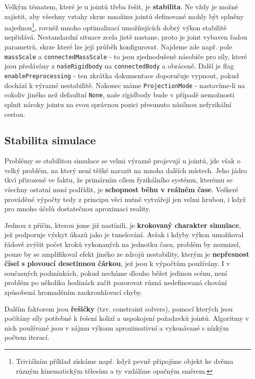 Velkým tématem, které je u jointů třeba řešit, je \textbf{stabilita}. Ne vždy je možné zajistit, aby všechny vztahy skrze množinu jointů definované mohly být splněny najednou\footnote{Triviálním příklad získáme např. když pevně připojíme objekt ke dvěma různým kinematickým tělesům a ty vzdálíme opačným směrem.}, rovněž mnoho optimalizací umožňujících dobrý výkon stabilitě nepřidává. Nestandardní situace zcela jistě nastane, proto je joint vybaven řadou parametrů, skrze které lze její průběh konfigurovat. Najdeme zde např. pole \texttt{massScale} a \texttt{connectedMassScale} - to jsou zjednodušeně násobiče pro síly, které jsou předávány z \texttt{našeRigidbody} na \texttt{connectedBody} a obráceně. Další je flag \texttt{enablePreprocessing} - ten zkrátka dokumentace doporučuje vypnout, pokud dochází k výrazné nestabilitě. Nakonec máme \texttt{ProjectionMode} - nastavíme-li na cokoliv jiného než defaultní \texttt{None}, naše rigidbody bude v případě nemožnosti splnit nároky jointu na svou správnou pozici přesunuto násilnou nefyzikální cestou. 

\subsection{Stabilita simulace} \label{physicsIntroSimulationStabilitySubsection}

Problémy se stabilitou simulace se velmi výrazně projevují u jointů, jde však o velký problém, na který není těžké narazit na mnoha dalších místech. Jeho jádro tkví přirozeně ve faktu, že primárním cílem fyzikálního systému, kterému se všechny ostatní musí podřídit, je \textbf{schopnost běhu v reálném čase}. Veškeré prováděné výpočty tedy z principu věci nutně vytvářejí jen velmi hrubou, i když pro mnoho účelů dostatečnou aproximaci reality.

Jednou z příčin, kterou jsme již nastínili, je \textbf{krokovaný charakter simulace}, jež podporuje výskyt úkazů jako je tunelování. Avšak i kdyby výkon umožňoval řádově zvýšit počet kroků vykonaných na jednotku času, problém by nezmizel, pouze by se amplifikoval efekt jiného ze zdrojů nestability, kterým je \textbf{nepřesnost čísel s plovoucí desetinnou čárkou}, jež jsou k výpočtům používány. I v současných podmínkách, pokud necháme dlouho běžet jedinou scénu, není problém po několika hodinách začít pozorovat různá nedefinovaná chování způsobená hromaděním zaokrouhlovací chyby.   

Dalším faktorem jsou \textbf{řešičky} (tzv. constraint solvers), pomocí kterých jsou počítány síly potřebné k řešení kolizí a uspokojení požadavků jointů. Algoritmy v nich používané jsou v zájmu výkonu aproximativní a vykonávané s nízkým počtem iterací.

